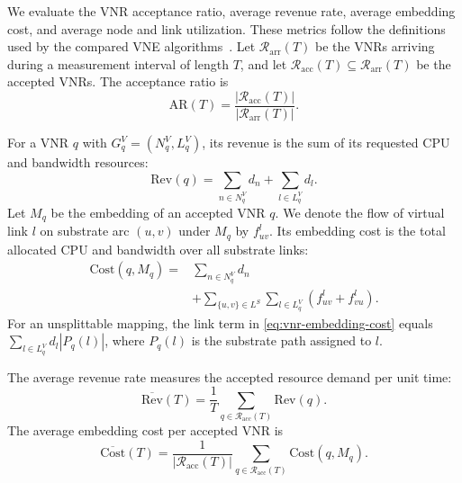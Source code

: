 \documentclass{ieeeaccess}
\begin{document}
We evaluate the VNR acceptance ratio, average revenue rate, average embedding cost, and average
node and link utilization. These metrics follow the definitions used by the compared VNE
algorithms~\cite{chowdhury2012vineyard,lu2022resource}. Let
$\mathcal{R}_{\mathrm{arr}}(T)$ be the VNRs arriving during a measurement interval of length $T$,
and let $\mathcal{R}_{\mathrm{acc}}(T)\subseteq\mathcal{R}_{\mathrm{arr}}(T)$ be the accepted VNRs.
The acceptance ratio is
\begin{equation}
	\mathrm{AR}(T)
	=
	\frac{|\mathcal{R}_{\mathrm{acc}}(T)|}
	{|\mathcal{R}_{\mathrm{arr}}(T)|}.
	\label{eq:acceptance-ratio}
\end{equation}

For a VNR $q$ with $G_q^V=(N_q^V,L_q^V)$, its revenue is the sum of its requested CPU and
bandwidth resources:
\begin{equation}
	\mathrm{Rev}(q)
	=
	\sum_{n\in N_q^V}d_n
	+
	\sum_{l\in L_q^V}d_l.
	\label{eq:vnr-revenue}
\end{equation}
Let $M_q$ be the embedding of an accepted VNR $q$. We denote the flow of virtual link $l$ on
substrate arc $(u,v)$ under $M_q$ by $f_{uv}^{l}$. Its embedding cost is the total allocated CPU
and bandwidth over all substrate links:
\begin{equation}
	\begin{aligned}
	\mathrm{Cost}(q,M_q)
	={}&\sum_{n\in N_q^V}d_n \\
	&+\sum_{\{u,v\}\in L^S}\sum_{l\in L_q^V}
	\left(f_{uv}^{l}+f_{vu}^{l}\right).
	\end{aligned}
	\label{eq:vnr-embedding-cost}
\end{equation}
For an unsplittable mapping, the link term in \eqref{eq:vnr-embedding-cost} equals
$\sum_{l\in L_q^V}d_l|P_q(l)|$, where $P_q(l)$ is the substrate path assigned to $l$.

The average revenue rate measures the accepted resource demand per unit time:
\begin{equation}
	\overline{\mathrm{Rev}}(T)
	=
	\frac{1}{T}
	\sum_{q\in\mathcal{R}_{\mathrm{acc}}(T)}
	\mathrm{Rev}(q).
	\label{eq:average-revenue-rate}
\end{equation}
The average embedding cost per accepted VNR is
\begin{equation}
	\overline{\mathrm{Cost}}(T)
	=
	\frac{1}{|\mathcal{R}_{\mathrm{acc}}(T)|}
	\sum_{q\in\mathcal{R}_{\mathrm{acc}}(T)}
	\mathrm{Cost}(q,M_q).
	\label{eq:average-embedding-cost}
\end{equation}
\end{document}
